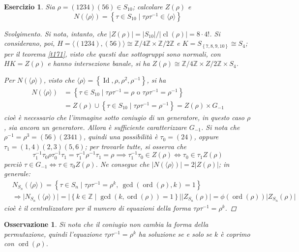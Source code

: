 \documentclass[11pt]{scrartcl}
\theoremstyle{style1}
\newtheorem{osservazione}{Osservazione}[section]
\newtheorem{esercizio}{Esercizio}[section]
\newenvironment{svolgimento}{\renewcommand\qedsymbol{$\blacksquare$}\begin{proof}[Svolgimento]}{\end{proof}}
\numberwithin{equation}{subsection}
\begin{document}
\begin{esercizio}
Sia $\rho = (1234)(56) \in S_{10}$; calcolare $Z(\rho )$ e 
\[
N(\langle \rho  \rangle)= \left\{ \tau \in S_{10}  \mid \tau \rho \tau ^{-1}\in \langle \rho  \rangle\right\} 
\] 
\begin{svolgimento}
	Si nota, intanto, che $\lvert Z(\rho ) \rvert = \lvert S_{10} \rvert / \lvert \operatorname{cl} (\rho ) \rvert = 8 \cdot 4!$.
	Si considerano, poi, $H = \langle (1234),(56) \rangle\cong \mathbb{Z}/4\mathbb{Z} \times \mathbb{Z}/2\mathbb{Z}$ e $K = S_{\left\{ 7,8,9,10 \right\} } \cong S_4$; per il teorema \ref{t171}, visto che questi due sottogruppi sono normali, con $HK = Z(\rho )$ e hanno intersezione banale, si ha $Z(\rho ) \cong \mathbb{Z}/4\mathbb{Z} \times Z / 2\mathbb{Z} \times S_4$.

	Per $N(\langle \rho  \rangle)$, visto che $\langle \rho  \rangle=\left\{ \operatorname{Id} , \rho ,\rho ^2, \rho ^{-1} \right\} $, si ha
	\[
		\begin{split}
			N(\langle \rho  \rangle) &= \left\{ \tau  \in S_{10}  \mid  \tau \rho \tau ^{-1}= \rho  \text{ o } \tau \rho \tau ^{-1}=\rho ^{-1}\right\} \\
						 &= Z(\rho )\cup \left\{ \tau \in S_{10}  \mid \tau \rho \tau ^{-1}=\rho ^{-1}\right\} = Z(\rho) \times G_{-1}
		\end{split}
	\] 
	cio\`e \`e necessario che l'immagine sotto coniugio di un generatore, in questo caso $\rho $, sia ancora un generatore.
	Allora \`e sufficiente caratterizzare $G_{-1} $.
	Si nota che $\rho ^{-1}= \rho ^{3}= (56)(2341)$, quindi una possibilit\`a \`e $\tau_0 = (24)$, oppure $\tau_1= (1,4)(2,3)(5,6)$; per trovarle tutte, si osserva che
	\[
	\tau _1^{-1}\tau _0 \rho \tau_0 ^{-1}\tau _1 = \tau _1^{-1}\rho ^{-1}\tau _1= \rho \implies \tau _1^{-1}\tau _0 \in Z(\rho ) \iff \tau _0 \in \tau _1 Z(\rho )
	\] 
	perci\`o $\tau \in G_{-1} \iff \tau \in \tau _0 Z(\rho )$. 
	Ne consegue che $\lvert N(\langle \rho  \rangle) \rvert = 2 \lvert Z(\rho ) \rvert $; in generale:
	\begin{equation}
		\begin{split}
			&N_{S_n} (\langle \rho  \rangle) = \left\{ \tau  \in S_n  \mid \tau \rho \tau ^{-1}=\rho ^{k}, \ \operatorname{gcd}(\operatorname{ord}(\rho ) ,k) =1 \right\} \\
			&\Rightarrow \lvert N_{S_n} (\langle \rho \rangle ) \rvert = \lvert \left\{ k \in \mathbb{Z} \mid \operatorname{gcd}(k,\operatorname{ord}(\rho ) ) =1 \right\}  \rvert \lvert Z_{S_n} (\rho ) \rvert =\phi (\operatorname{ord}(\rho ) ) \lvert Z_{S_n} (\rho ) \rvert 
		\end{split}
	\end{equation}
	cio\`e \`e il centralizzatore per il numero di equazioni della forma $\tau \rho \tau ^{-1}= \rho ^k$.
\end{svolgimento}
\end{esercizio}
\begin{osservazione}
	Si nota che il coniugio non cambia la forma della permutazione, quindi l'equazione $\tau \rho \tau ^{-1} = \rho ^k$ ha soluzione se e solo se $k$ \`e coprimo con $\operatorname{ord}(\rho ) $.
\end{osservazione}
\end{document}
